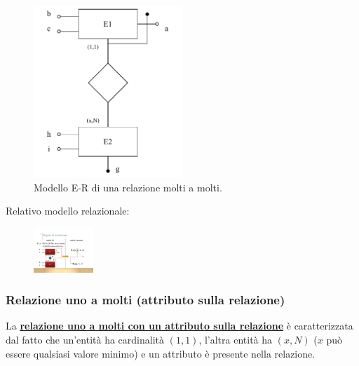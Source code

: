 \documentclass[a4paper]{article}
\begin{document}
	\begin{figure}[!htp]
		\centering
		\includegraphics[width=0.5\textwidth]{img/relazionale_uno_a_molti_id_esterno.pdf}
		\caption{Modello E-R di una relazione molti a molti.}
	\end{figure}
	
	\noindent
	Relativo modello relazionale:
	
	\begin{figure}[!htp]
		\centering
		\includegraphics[width=0.2\textwidth]{img/relazionale_uno_a_molti_id_esterno2.pdf}
	\end{figure}

	\newpage
	
	\subsubsection{Relazione uno a molti (attributo sulla relazione)}
	
	La \textcolor{Red3}{\textbf{\underline{relazione uno a molti con un attributo sulla relazione}}} è caratterizzata dal fatto che un'entità ha cardinalità $\left(1,1\right)$, l'altra entità ha $\left(x,N\right)$ ($x$ può essere qualsiasi valore minimo) e un attributo è presente nella relazione.
	
\end{document}

